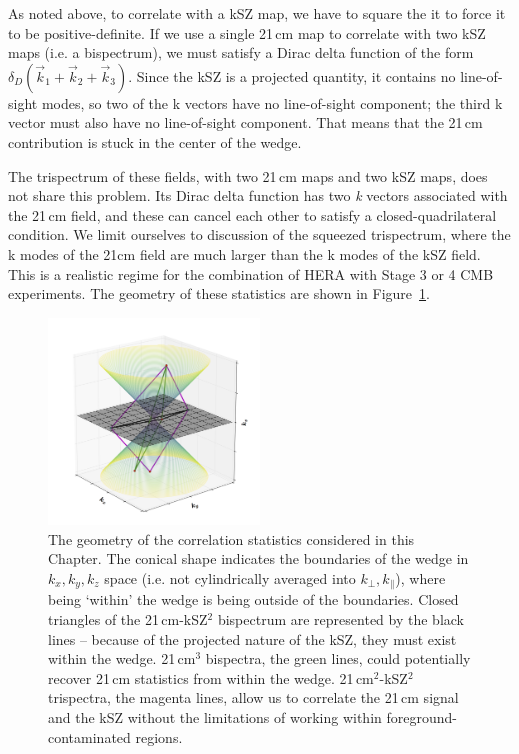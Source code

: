 As noted above, to correlate with a kSZ map, we have to square the it to force it to be positive-definite. If we use a single 21\,cm map to correlate with two kSZ maps (i.e. a bispectrum), we must satisfy a Dirac delta function of the form $\delta_D(\vec{k}_1 + \vec{k}_2 + \vec{k}_3)$. Since the kSZ is a projected quantity, it contains no line-of-sight modes, so two of the k vectors have no line-of-sight component; the third k vector must also have no line-of-sight component. That means that the 21\,cm contribution is stuck in the center of the wedge.

The trispectrum of these fields, with two 21\,cm maps and two kSZ maps, does not share this problem. Its Dirac delta function has two \textit{k} vectors associated with the 21\,cm field, and these can cancel each other to satisfy a closed-quadrilateral condition. We limit ourselves to discussion of the squeezed trispectrum, where the k modes of the 21cm field are much larger than the k modes of the kSZ field. This is a realistic regime for the combination of HERA with Stage 3 or 4 CMB experiments. The geometry of these statistics are shown in Figure~\ref{fig:ksz_21cm_correlation_geometries}. 

\begin{figure}
\centering
\includegraphics[width=0.5\textwidth]{chapters/ksz_21cm/figures/trispec_and_bispec_3d_fig.png}
\caption[The geometry of the correlation statistics considered in this Chapter.]{The geometry of the correlation statistics considered in this Chapter. The conical shape indicates the boundaries of the wedge in $k_x,k_y,k_z$ space (i.e. not cylindrically averaged into $k_{\perp},k_{\parallel}$), where being `within' the wedge is being outside of the boundaries. Closed triangles of the 21\,cm-kSZ$^2$ bispectrum are represented by the black lines -- because of the projected nature of the kSZ, they must exist within the wedge. 21\,cm$^3$ bispectra, the green lines, could potentially recover 21\,cm statistics from within the wedge. 21\,cm$^2$-kSZ$^2$ trispectra, the magenta lines, allow us to correlate the 21\,cm signal and the kSZ without the limitations of working within foreground-contaminated regions.}
\label{fig:ksz_21cm_correlation_geometries}
\end{figure}

